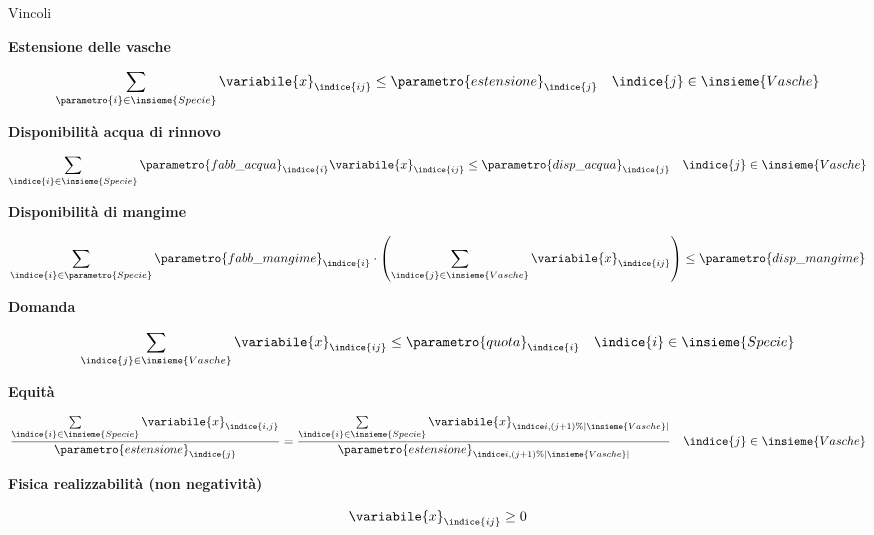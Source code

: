 \documentclass{beamer}
\begin{document}
\begin{frame}[allowframebreaks]{Vincoli}

\textbf{Estensione delle vasche}

$$ \sum_{\parametro{i} \in \insieme{Specie}} \variabile{x}_{\indice{ij}} \leq \parametro{estensione}_{\indice{j}} \quad \indice{j} \in \insieme{Vasche}$$

\textbf{Disponibilit\`a acqua di rinnovo}

$$ \sum_{\indice{i} \in \insieme{Specie}} \parametro{fabb\_acqua}_{\indice{i}} \variabile{x}_{\indice{ij}} \leq \parametro{disp\_acqua}_{\indice{j}} \quad \indice{j} \in \insieme{Vasche}$$

\framebreak

\textbf{Disponibilit\`a di mangime}

$$ \sum_{\indice{i} \in \parametro{Specie}} \parametro{fabb\_mangime}_{\indice{i}} \cdot
      \left( \sum_{\indice{j} \in \insieme{Vasche}} \variabile{x}_{\indice{ij}} \right) \leq \parametro{disp\_mangime}$$

\textbf{Domanda}

$$ \sum_{\indice{j} \in \insieme{Vasche}} \variabile{x}_{\indice{ij}} \leq \parametro{quota}_{\indice{i}} \quad \indice{i} \in \insieme{Specie}$$

\textbf{Equit\`a}

$$ \frac{\sum\limits_{\indice{i} \in \insieme{Specie}} \variabile{x}_{\indice{i,j}}}{\parametro{estensione}_{\indice{j}}} =
   \frac{\sum\limits_{\indice{i} \in \insieme{Specie}} \variabile{x}_{\indice{i,(j+1)\%|\insieme{Vasche}|}}}{\parametro{estensione}_{\indice{i,(j+1)\%|\insieme{Vasche}|}}}
   \quad \indice{j} \in \insieme{Vasche}$$

\textbf{Fisica realizzabilit\`a (non negativit\`a)}

$$ \variabile{x}_{\indice{ij}} \geq 0 $$
\end{frame}
\end{document}
